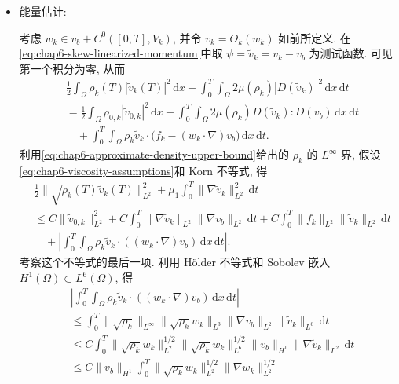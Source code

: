 \begin{sloppypar}
\begin{itemize}
 \item 能量估计:

 考虑 $w_k\in v_b+C^0([0,T],V_k)$, 并令 $v_k=\Theta_k(w_k)$ 如前所定义. 在\eqref{eq:chap6-skew-linearized-momentum}中取 $\psi=\widetilde v_k=v_k-v_b$ 为测试函数. 可见第一个积分为零, 从而
 \[
 \begin{aligned}
 &\frac12\int_\Omega\rho_k(T)|\widetilde v_k(T)|^2\,\mathrm dx
 +\int_0^T\int_\Omega2\mu(\rho_k)|D(\widetilde v_k)|^2\,\mathrm dx\,\mathrm dt\\
 &=\frac12\int_\Omega\rho_{0,k}|\widetilde v_{0,k}|^2\,\mathrm dx
 -\int_0^T\int_\Omega2\mu(\rho_k)D(\widetilde v_k):D(v_b)\,\mathrm dx\,\mathrm dt\\
 &\quad+\int_0^T\int_\Omega\rho_k\widetilde v_k\cdot
 \bigl(f_k-(w_k\cdot\nabla)v_b\bigr)\,\mathrm dx\,\mathrm dt.
 \end{aligned}
 \]
 利用\eqref{eq:chap6-approximate-density-upper-bound}给出的 $\rho_k$ 的 $L^\infty$ 界, 假设\eqref{eq:chap6-viscosity-assumptions}和 Korn 不等式, 得
 \begin{equation}
 \begin{aligned}
 &\frac12\|\sqrt{\rho_k(T)}\widetilde v_k(T)\|_{L^2}^2
 +\mu_1\int_0^T\|\nabla\widetilde v_k\|_{L^2}^2\,\mathrm dt\\
 &\leq C\|\widetilde v_{0,k}\|_{L^2}^2
 +C\int_0^T\|\nabla\widetilde v_k\|_{L^2}\|\nabla v_b\|_{L^2}\,\mathrm dt
 +C\int_0^T\|f_k\|_{L^2}\|\widetilde v_k\|_{L^2}\,\mathrm dt\\
 &\quad+\left|\int_0^T\int_\Omega
 \rho_k\widetilde v_k\cdot((w_k\cdot\nabla)v_b)\,\mathrm dx\,\mathrm dt\right|.
 \end{aligned}
 \label{eq:chap6-fixed-point-energy-preestimate}
 \end{equation}
 考察这个不等式的最后一项. 利用 H\"older 不等式和 Sobolev 嵌入 $H^1(\Omega)\subset L^6(\Omega)$, 得
 \[
 \begin{aligned}
 &\left|\int_0^T\int_\Omega\rho_k\widetilde v_k\cdot((w_k\cdot\nabla)v_b)
 \,\mathrm dx\,\mathrm dt\right|\\
 &\leq\int_0^T\|\sqrt{\rho_k}\|_{L^\infty}
 \|\sqrt{\rho_k}w_k\|_{L^3}\|\nabla v_b\|_{L^2}\|\widetilde v_k\|_{L^6}\,\mathrm dt\\
 &\leq C\int_0^T\|\sqrt{\rho_k}w_k\|_{L^2}^{1/2}
 \|\sqrt{\rho_k}w_k\|_{L^6}^{1/2}
 \|v_b\|_{H^1}\|\nabla\widetilde v_k\|_{L^2}\,\mathrm dt\\
 &\leq C\|v_b\|_{H^1}\int_0^T
 \|\sqrt{\rho_k}w_k\|_{L^2}^{1/2}
 \|\nabla w_k\|_{L^2}^{1/2}

\end{aligned}\]
\end{itemize}
\end{sloppypar}
